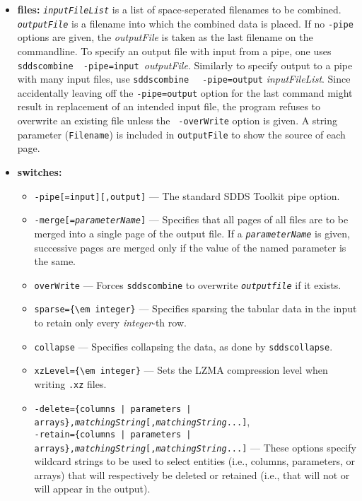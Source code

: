 \begin{itemize}
\item {\bf files:}
{\tt {\em inputFileList}} is a list of space-seperated filenames to be combined.  {\tt {\em outputFile}} is a filename
into which the combined data is placed.  If no {\tt -pipe} options are given, the {\em outputFile} is taken as the last
filename on the commandline.  To specify an output file with input from a pipe, one uses {\tt sddscombine }{\tt
-pipe=input }{\em outputFile}.  Similarly to specify output to a pipe with many input files, use {\tt sddscombine } {\tt
-pipe=output} {\em inputFileList}.  Since accidentally leaving off the {\tt -pipe=output} option for the last command
might result in replacement of an intended input file, the program refuses to overwrite an existing file unless the {\tt
-overWrite} option is given.  A string parameter ({\tt Filename}) is included in {\tt outputFile} to show the source of
each page.
\item {\bf switches:}
    \begin{itemize}
    \item {\tt -pipe[=input][,output]} --- The standard SDDS Toolkit pipe option.
    \item {\tt -merge[={\em parameterName}]} --- 
        Specifies that all pages of all files are to be merged into a single page
        of the output file.  If a {\tt {\em parameterName}} is given, successive pages are merged only if the
        value of the named parameter is the same.
    \item \verb|overWrite| --- Forces {\tt sddscombine} to overwrite {\tt {\em outputfile}} if it exists.
    \item \verb|sparse={\em integer}| --- Specifies sparsing the tabular data in the input to retain
        only every {\em integer}-th row.
    \item \verb|collapse| --- Specifies collapsing the data, as done by \verb|sddscollapse|.
    \item \verb|xzLevel={\em integer}| --- Sets the LZMA compression level when writing \verb|.xz| files.
    \item {\tt -delete=\{columns | parameters | arrays\},{\em matchingString}[,{\em matchingString}...]},\\
        {\tt -retain=\{columns | parameters | arrays\},{\em matchingString}[,{\em matchingString}...]}
         --- These options specify wildcard strings to be used to select entities
        (i.e., columns, parameters, or arrays) that will respectively be deleted or retained (i.e., that will not or
        will appear in the output).   

\end{itemize}
\end{itemize}
